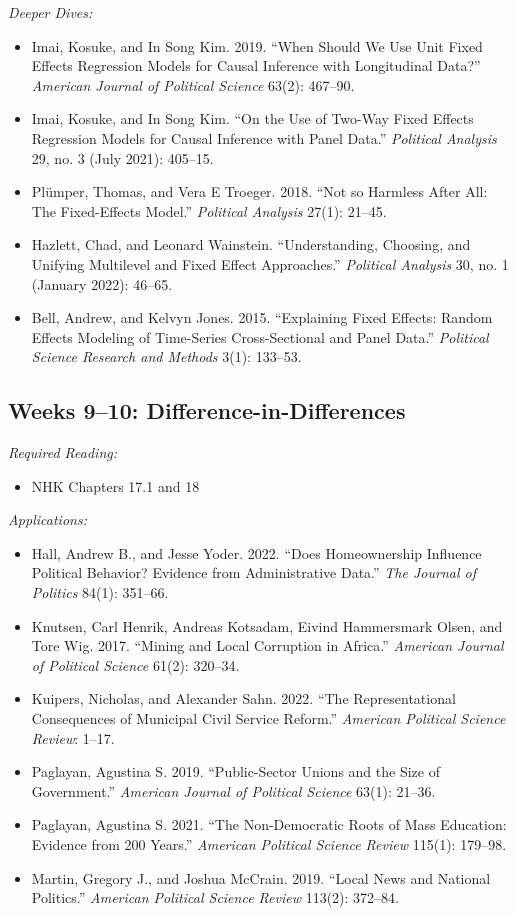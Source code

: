 \documentclass[11pt, letterpaper]{article}
\begin{document}
\noindent \textit{Deeper Dives:}

\begin{itemize}
	\item Imai, Kosuke, and In Song Kim. 2019. ``When Should We Use Unit Fixed Effects Regression Models for Causal Inference with Longitudinal Data?'' \textit{American Journal of Political Science} 63(2): 467–90.
	\item Imai, Kosuke, and In Song Kim. ``On the Use of Two-Way Fixed Effects Regression Models for Causal Inference with Panel Data.'' \textit{Political Analysis} 29, no. 3 (July 2021): 405–15.
	\item Plümper, Thomas, and Vera E Troeger. 2018. “Not so Harmless After All: The Fixed-Effects Model.” \textit{Political Analysis} 27(1): 21–45.
	\item Hazlett, Chad, and Leonard Wainstein. ``Understanding, Choosing, and Unifying Multilevel and Fixed Effect Approaches.'' \textit{Political Analysis} 30, no. 1 (January 2022): 46–65.
	\item Bell, Andrew, and Kelvyn Jones. 2015. “Explaining Fixed Effects: Random Effects Modeling of Time-Series Cross-Sectional and Panel Data.” \textit{Political Science Research and Methods} 3(1): 133–53.
\end{itemize}

\subsection*{Weeks 9--10: Difference-in-Differences}

\textit{Required Reading:}

\begin{itemize}
	\item NHK Chapters 17.1 and 18
\end{itemize}

\noindent \textit{Applications:}

\begin{itemize}
	\item Hall, Andrew B., and Jesse Yoder. 2022. ``Does Homeownership Influence Political Behavior? Evidence from Administrative Data.'' \textit{The Journal of Politics} 84(1): 351–66.
	\item Knutsen, Carl Henrik, Andreas Kotsadam, Eivind Hammersmark Olsen, and Tore Wig. 2017. ``Mining and Local Corruption in Africa.'' \textit{American Journal of Political Science} 61(2): 320–34.
	\item Kuipers, Nicholas, and Alexander Sahn. 2022. ``The Representational Consequences of Municipal Civil Service Reform.'' \textit{American Political Science Review}: 1–17.
	\item Paglayan, Agustina S. 2019. ``Public-Sector Unions and the Size of Government.'' \textit{American Journal of Political Science} 63(1): 21–36.
	\item Paglayan, Agustina S. 2021. ``The Non-Democratic Roots of Mass Education: Evidence from 200 Years.'' \textit{American Political Science Review} 115(1): 179–98.
	\item Martin, Gregory J., and Joshua McCrain. 2019. “Local News and National Politics.” \textit{American Political Science Review} 113(2): 372–84.
\end{itemize}
\end{document}
